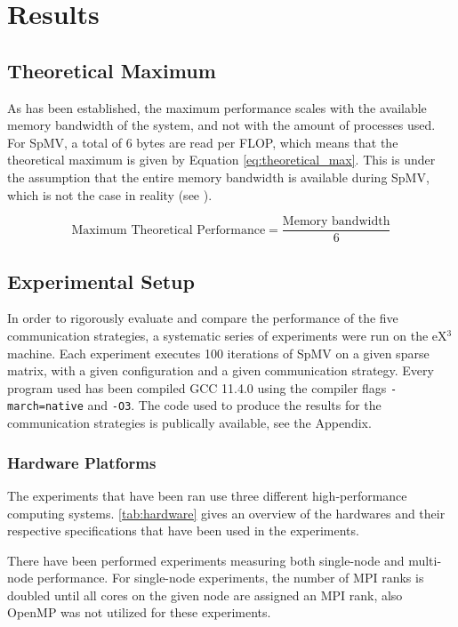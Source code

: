 \chapter{Results} \label{results}

\section{Theoretical Maximum}
As has been established, the maximum performance scales with the available memory bandwidth of the system, and not with the amount of processes used. For SpMV, a total of 6 bytes are read per FLOP, which means that the theoretical maximum is given by Equation \ref{eq:theoretical_max}. This is under the assumption that the entire memory bandwidth is available during SpMV, which is not the case in reality (see \cite{ordersparse}).

\begin{equation}
\text{Maximum Theoretical Performance} = \frac{\text{Memory bandwidth}}{6}
\label{eq:theoretical_max}
\end{equation}


\section{Experimental Setup}
In order to rigorously evaluate and compare the performance of the five communication strategies, a systematic series of experiments were run on the eX\(^{3}\) machine. Each experiment executes 100 iterations of SpMV on a given sparse matrix, with a given configuration and a given communication strategy. Every program used has been compiled GCC 11.4.0 using the compiler flags \texttt{-march=native} and \texttt{-O3}. The code used to produce the results for the communication strategies is publically available, see the Appendix.
 
\subsection{Hardware Platforms}
The experiments that have been ran use three different high‐performance computing systems. \autoref{tab:hardware} gives an overview of the hardwares and their respective specifications that have been used in the experiments.




There have been performed experiments measuring both single-node and multi-node performance. For single-node experiments, the number of MPI ranks is doubled until all cores on the given node are assigned an MPI rank, also OpenMP was not utilized for these experiments.
\medskip

